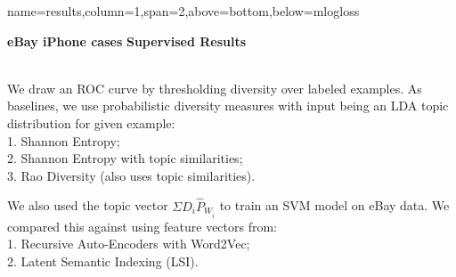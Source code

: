 \documentclass[portrait,a0paper]{baposter-templ/baposter}
\begin{document}
\begin{poster}
{name=results,column=1,span=2,above=bottom,below=mlogloss}{ 
\vspace{-1mm}
\begin{multicols}{2}
\begin{center}
{\bf eBay iPhone cases} \quad\quad{}
{\bf Supervised Results}
\end{center}

\ \\
We draw an ROC curve by thresholding diversity
  over labeled examples. As baselines, we use probabilistic diversity 
  measures with input being an LDA topic distribution for  given
  example:\\
1. Shannon Entropy;\\
2. Shannon Entropy with topic similarities;\\
3. Rao Diversity (also uses topic similarities).

\bigskip
We also used the topic vector $\Sigma
D_i \widehat{P}_{W_{\bar{i}}}$ to train an SVM model on eBay data. We
compared this against using feature vectors from:\\ 
1. Recursive Auto-Encoders with Word2Vec;\\
2. Latent Semantic Indexing (LSI).
\end{multicols}
}



\end{poster}
\end{document}
